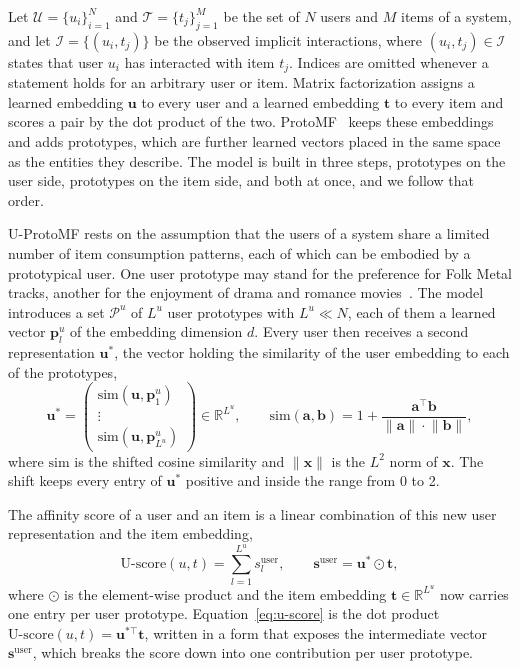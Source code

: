 Let $\mathcal{U} = \{u_i\}_{i=1}^{N}$ and $\mathcal{T} = \{t_j\}_{j=1}^{M}$ be
the set of $N$ users and $M$ items of a system, and let
$\mathcal{I} = \{(u_i, t_j)\}$ be the observed implicit interactions, where
$(u_i, t_j) \in \mathcal{I}$ states that user $u_i$ has interacted with item
$t_j$. Indices are omitted whenever a statement holds for an arbitrary user or
item. Matrix factorization assigns a learned embedding $\mathbf{u}$ to every
user and a learned embedding $\mathbf{t}$ to every item and scores a pair by
the dot product of the two. ProtoMF~\cite{melchiorre2022protomf} keeps these
embeddings and adds prototypes, which are further learned vectors placed in
the same space as the entities they describe. The model is built in three
steps, prototypes on the user side, prototypes on the item side, and both at
once, and we follow that order.

U-ProtoMF rests on the assumption that the users of a system share a limited
number of item consumption patterns, each of which can be embodied by a
prototypical user. One user prototype may stand for the preference for Folk
Metal tracks, another for the enjoyment of drama and romance
movies~\cite{melchiorre2022protomf}. The model introduces a set $\mathcal{P}^u$
of $L^u$ user prototypes with $L^u \ll N$, each of them a learned vector
$\mathbf{p}^u_l$ of the embedding dimension $d$. Every user then receives a
second representation $\mathbf{u}^*$, the vector holding the similarity of the
user embedding to each of the prototypes,
\begin{equation}
\mathbf{u}^* =
\begin{pmatrix}
\mathrm{sim}(\mathbf{u}, \mathbf{p}^u_1) \\
\vdots \\
\mathrm{sim}(\mathbf{u}, \mathbf{p}^u_{L^u})
\end{pmatrix}
\in \mathbb{R}^{L^u},
\qquad
\mathrm{sim}(\mathbf{a}, \mathbf{b}) = 1 +
\frac{\mathbf{a}^\top \mathbf{b}}
     {\lVert \mathbf{a} \rVert \cdot \lVert \mathbf{b} \rVert},
\label{eq:proto-sim}
\end{equation}
where $\mathrm{sim}$ is the shifted cosine similarity and
$\lVert \mathbf{x} \rVert$ is the $L^2$ norm of $\mathbf{x}$. The shift keeps
every entry of $\mathbf{u}^*$ positive and inside the range from 0 to 2.

The affinity score of a user and an item is a linear combination of this new
user representation and the item embedding,
\begin{equation}
\text{U-score}(u,t) = \sum_{l=1}^{L^u} s^{\mathrm{user}}_l,
\qquad
\mathbf{s}^{\mathrm{user}} = \mathbf{u}^* \odot \mathbf{t},
\label{eq:u-score}
\end{equation}
where $\odot$ is the element-wise product and the item embedding
$\mathbf{t} \in \mathbb{R}^{L^u}$ now carries one entry per user prototype.
Equation~\ref{eq:u-score} is the dot product
$\text{U-score}(u,t) = \mathbf{u}^{*\top} \mathbf{t}$, written in a form that
exposes the intermediate vector $\mathbf{s}^{\mathrm{user}}$, which breaks the
score down into one contribution per user prototype.


